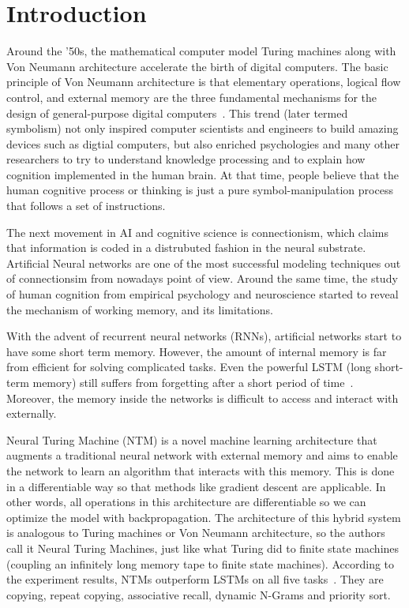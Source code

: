 \documentclass[12pt,twoside]{article}
\theoremstyle{plain}
\theoremstyle{definition}
\theoremstyle{remark}
\begin{document}
\section{Introduction}
\label{sec:introduction}
Around the '50s, the mathematical computer model Turing machines along with Von Neumann architecture accelerate the birth of digital computers. The basic principle of Von Neumann architecture is that elementary operations, logical flow control, and external memory are the three fundamental mechanisms for the design of general-purpose digital computers~\cite{von}. This trend (later termed symbolism) not only inspired computer scientists and engineers to build amazing devices such as digtial computers, but also enriched psychologies and many other researchers to try to understand knowledge processing and to explain how cognition implemented in the human brain. At that time, people believe that the human cognitive process or thinking is just a pure symbol-manipulation process that follows a set of instructions.

The next movement in AI and cognitive science is connectionism, which claims that information is coded in a distrubuted fashion in the neural substrate. Artificial Neural networks are one of the most successful modeling techniques out of connectionsim from nowadays point of view. Around the same time, the study of human cognition from empirical psychology and neuroscience started to reveal the mechanism of working memory, and its limitations.

With the advent of recurrent neural networks (RNNs), artificial networks start to have some short term memory. However, the amount of internal memory is far from efficient for solving complicated tasks. Even the powerful LSTM (long short-term memory) still suffers from forgetting after a short period of time~\cite{lstm-forget}. Moreover, the memory inside the networks is difficult to access and interact with externally.

Neural Turing Machine (NTM) is a novel machine learning architecture that augments a traditional neural network with external memory and aims to enable the network to learn an algorithm that interacts with this memory. This is done in a differentiable way so that methods like gradient descent are applicable. In other words, all operations in this architecture are differentiable so we can optimize the model with backpropagation. The architecture of this hybrid system is analogous to Turing machines or Von Neumann architecture, so the authors call it Neural Turing Machines, just like what Turing did to finite state machines (coupling an infinitely long memory tape to finite state machines). According to the experiment results, NTMs outperform LSTMs on all five tasks~\cite{original-ntm}. They are copying, repeat copying, associative recall, dynamic N-Grams and priority sort.
\end{document}
